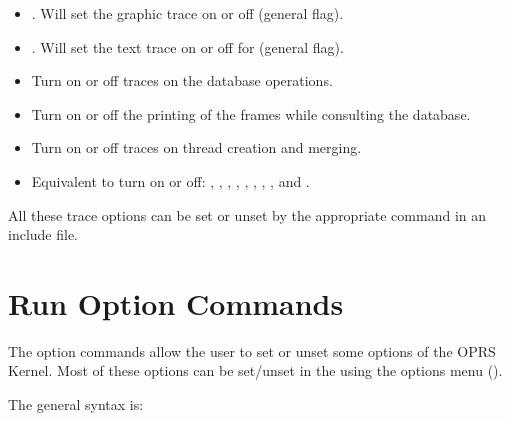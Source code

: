 \begin{itemize}
\item {}. Will set the graphic
trace on or off (general flag).

\item {}.  Will set the text trace
on or off for (general flag).

\item {} Turn on or off traces on the database
operations.

\item {} Turn on or off the printing of the frames
while consulting the database.

\item {} Turn on or off traces on thread creation and
merging.

\item {} Equivalent to turn on or off: ,
, , , , ,
, ,  and .

\end{itemize}

All these trace options can be set or unset by the appropriate command in
an include file.

\section{\CPK{} Run Option Commands}

The option commands allow the user to set or unset some options of the OPRS
Kernel. Most of these options can be set/unset in the \XPK{} using the options
menu ().

The general syntax is:


